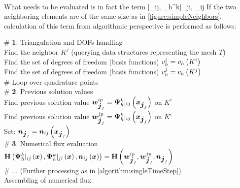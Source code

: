 \paragraph{}
What needs to be evaluated is in fact the term
\be
\mrH{}|_{ij}\lo\bfx\ro, {\mrPsi_h^{k}}|_{ji}\lo\bfx\ro, \bfn_{ij}\lo\bfx\ro\ro
\ee
If the two neighboring elements are of the same size as in \cref{figure:simpleNeighbors}, calculation of this term from algorithmic perspective is performed as follows:\\
\begin{algorithm}[H]
\# \textbf{1}. Triangulation and DOFs handling\\
Find the neighbor $K^j$ (querying data structures representing the mesh $T$)\\
Find the set of degrees of freedom (basis functions) $v_h^i = v_h \left( K^i\right)$\\
Find the set of degrees of freedom (basis functions) $v_h^j = v_h \left( K^j\right)$\\

\# Loop over quadrature points\\
{
	\# \textbf{2}. Previous solution values\\
	Find previous solution value $\mbox{\boldmath $w$}_{\mbox{\boldmath $j$}_f}^{ip} = {\mathrm{\mathbf{\Psi}}_h^{k}}|_{ij}\left(\mbox{\boldmath $x$}_{\mbox{\boldmath $j$}_f}\right)$ on $K^i$\\
	Find previous solution value $\mbox{\boldmath $w$}_{\mbox{\boldmath $j$}_f}^{jp} = {\mathrm{\mathbf{\Psi}}_h^{k}}|_{ij}\left(\mbox{\boldmath $x$}_{\mbox{\boldmath $j$}_f}\right)$ on $K^i$\\
	Set: $\mbox{\boldmath $n$}_{\mbox{\boldmath $j$}_f} = \mbox{\boldmath $n$}_{ij}\left(\mbox{\boldmath $x$}_{\mbox{\boldmath $j$}_f}\right)$\\
	\# \textbf{3}. Numerical flux evaluation\\
	$\mathrm{\mathbf{H}}\left({\mathrm{\mathbf{\Psi}}_h^{k}}|_{ij}\left(\mbox{\boldmath $x$}\right), {\mathrm{\mathbf{\Psi}}_h^{k}}|_{ji}\left(\mbox{\boldmath $x$}\right), \mbox{\boldmath $n$}_{ij}\left(\mbox{\boldmath $x$}\right)\right)
		= \mathrm{\mathbf{H}}\left(\mbox{\boldmath $w$}_{\mbox{\boldmath $j$}_f}^{ip}, \mbox{\boldmath $w$}_{\mbox{\boldmath $j$}_f}^{jp}, \mbox{\boldmath $n$}_{\mbox{\boldmath $j$}_f}\right)$\\
		
	\# ... (Further processing as in \cref{algorithm:singleTimeStep})
}
\ \\
\caption{Assembling of numerical flux}
\label{algorithm:numFluxSimple}
\end{algorithm}


